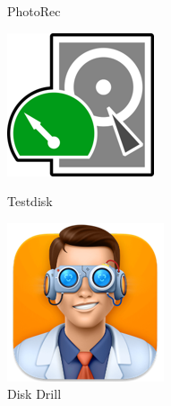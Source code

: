 \documentclass[12pt,oneside,slovak,a4paper]{article}
\begin{document}
\begin{figure}[H]
\begin{minipage}{.15\textwidth}
		\captionsetup{justification=centering}
        \caption{PhotoRec}
    \end{minipage}\hfill
    \centering
    \begin{minipage}{.15\textwidth}
        \centering
        \includegraphics[width=\linewidth]{./images/tools-avatars/testdisk.png}
		\captionsetup{justification=centering}
        \caption{Testdisk}
    \end{minipage}\hfill
    \begin{minipage}{.15\textwidth}
        \centering
        \includegraphics[width=\linewidth]{./images/tools-avatars/disk_drill.png}
		\captionsetup{justification=centering}
        \caption{Disk Drill}
    \end{minipage}\hfill
\end{figure}
\end{document}
